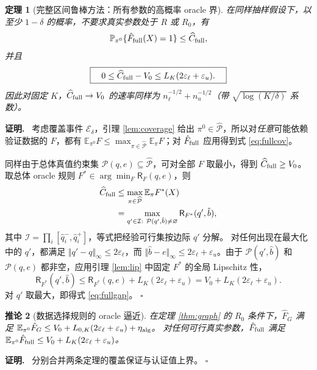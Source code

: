 \documentclass[11pt,a4paper]{ctexart}
\newtheorem{theorem}{定理}[section]
\newtheorem{corollary}[theorem]{推论}
\theoremstyle{definition}
\newenvironment{proofcn}{\par\noindent\textbf{证明.}\ }{\hfill$\square$\par}
\newcommand{\calP}{\mathcal P}
\newcommand{\Rsk}{\mathsf R}
\newcommand{\Pp}{\mathbb P}
\newcommand{\Ee}{\mathbb E}
\newcommand{\epsl}{\varepsilon_{\ell}}
\newcommand{\epsu}{\varepsilon_u}
\newcommand{\hC}{\widehat C}
\begin{document}
\begin{theorem}[完整区间鲁棒方法：所有参数的高概率 oracle 界]\label{thm:full}
在同样抽样假设下，以至少 $1-\delta$ 的概率，\emph{不要求}真实参数处于 $R$ 或 $R_0$，有
\begin{equation}\label{eq:fullcov}
\Pp_{\pi^0}\{\hat F_{\rm full}(X)=1\}\le\hC_{\rm full},
\end{equation}
并且
\begin{equation}\label{eq:fullgap}
\boxed{\quad 0\le\hC_{\rm full}-V_0\le L_K(2\epsl+\epsu).\quad}
\end{equation}
因此对固定 $K$，$\hC_{\rm full}\to V_0$ 的速率同样为 $n_\ell^{-1/2}+n_u^{-1/2}$（带 $\sqrt{\log(K/\delta)}$ 系数）。
\end{theorem}
\begin{proofcn}
考虑覆盖事件 $\mathcal E_\delta$，引理 \ref{lem:coverage} 给出 $\pi^0\in\widehat{\calP}$，所以对\emph{任意}可能依赖验证数据的 $F$，都有 $\Ee_{\pi^0}F\le\max_{\pi\in\widehat{\calP}}\Ee_\pi F$；对 $\hat F_{\rm full}$ 应用得到式 \eqref{eq:fullcov}。

同样由于总体真值约束集 $\calP(q,e)\subseteq\widehat{\calP}$，可对全部 $F$ 取最小，得到 $\hC_{\rm full}\ge V_0$。取总体 oracle 规则 $F^*\in\arg\min_F\Rsk_F(q,e)$，则
\begin{align*}
\hC_{\rm full}&\le\max_{\pi\in\widehat{\calP}}\Ee_\pi F^*(X)\\
&=\max_{q'\in\mathcal I:\ \calP(q',\hat b)\ne\varnothing}\Rsk_{F^*}(q',\hat b),
\end{align*}
其中 $\mathcal I=\prod_i[\hat q_i^-,\hat q_i^+]$，等式把经验可行集按边际 $q'$ 分解。
对任何出现在最大化中的 $q'$，都满足 $\Vert q'-q\Vert_\infty\le2\epsl$，而 $\Vert\hat b-e\Vert_\infty\le2\epsl+\epsu$。由于 $\calP(q',\hat b)$ 和 $\calP(q,e)$ 都非空，应用引理 \ref{lem:lip} 中固定 $F^*$ 的全局 Lipschitz 性，
\[
\Rsk_{F^*}(q',\hat b)\le\Rsk_{F^*}(q,e)+L_K(2\epsl+\epsu)
=V_0+L_K(2\epsl+\epsu).
\]
对 $q'$ 取最大，即得式 \eqref{eq:fullgap}。
\end{proofcn}

\begin{corollary}[数据选择规则的 oracle 逼近]\label{cor:sel}
在定理 \ref{thm:graph} 的 $R_0$ 条件下，$\hat F_G$ 满足
$\Ee_{\pi^0}\hat F_G\le V_0+L_{0,K}(2\epsl+\epsu)+\eta_{\rm alg}$。
对任何可行真实参数，$\hat F_{\rm full}$ 满足
$\Ee_{\pi^0}\hat F_{\rm full}\le V_0+L_K(2\epsl+\epsu)$。
\end{corollary}
\begin{proofcn}
分别合并两条定理的覆盖保证与认证值上界。
\end{proofcn}
\end{document}
